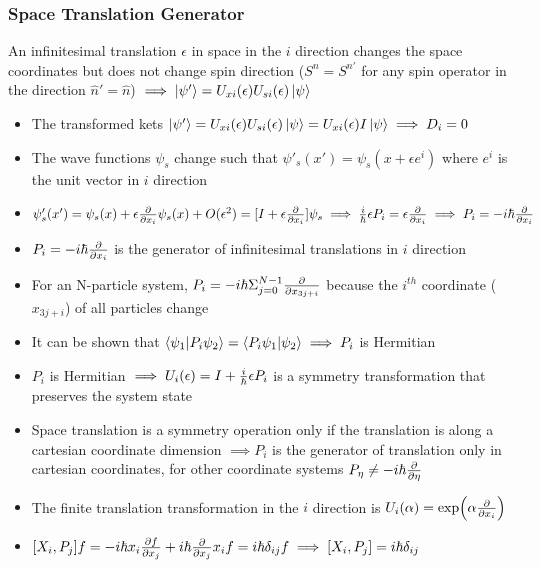 \documentclass[8pt,t,mathserif,aspectratio=169]{beamer}
\begin{document}
\begin{frame}
  \frametitle{Space Translation Generator}
  \vspace{1mm}
  An infinitesimal translation $\epsilon$ in space in the $i$ direction changes the space coordinates but does not change spin direction ($S^n = S^{n'}$ for any spin operator in the direction $\hat{n}' = \hat{n}$) $\implies \ket{\psi'} = U_{xi}(\epsilon) U_{si}(\epsilon) \ket{\psi}$
  \begin{itemize}
    \item The transformed kets $\ket{\psi'} = U_{xi}(\epsilon) U_{si}(\epsilon) \ket{\psi} = U_{xi}(\epsilon) I \ket{\psi} \implies D_i = 0$
    \item The wave functions $\psi_s$ change such that $\psi'_s(x') = \psi_s(x + \epsilon e^i)$ where $e^i$ is the unit vector in $i$ direction
    \item $\psi'_s(x') = \psi_s(x) + \epsilon {\partial \over \partial x_i} \psi_s(x) + O(\epsilon^2) = [I + \epsilon {\partial \over \partial x_i}] \psi_s \implies {i \over \hbar} \epsilon P_i = \epsilon {\partial \over \partial x_i} \implies P_i = -i \hbar {\partial \over \partial x_i}$
    \item $P_i = -i \hbar {\partial \over \partial x_i}$ is the generator of infinitesimal translations in $i$ direction
    \item For an N-particle system, $P_i = -i \hbar \Sigma^{N -1}_{j = 0} {\partial \over \partial x_{3j + i}}$ because the $i^{th}$ coordinate ($x_{3j + i}$) of all particles change
    \item It can be shown that $\bra{\psi_1}\ket{P_i \psi_2} = \bra{P_i \psi_1} \ket{\psi_2} \implies P_i$ is Hermitian 
    \item $P_i$ is Hermitian $\implies U_i(\epsilon) = I + {i \over \hbar} \epsilon P_i$ is a symmetry transformation that preserves the system state
    \item Space translation is a symmetry operation only if the translation is along a cartesian coordinate dimension $\implies P_i$ is the generator of translation only in cartesian coordinates, for other coordinate systems $P_\eta \neq -i \hbar {\partial \over \partial \eta}$
    \item The finite translation transformation in the $i$ direction is $U_i(\alpha) = \exp(\alpha {\partial \over \partial x_i})$
    \item $[X_i,P_j]f = -i \hbar x_i {\partial f \over \partial x_j} + i \hbar {\partial \over \partial x_j} x_i f = i \hbar \delta_{ij} f \implies [X_i,P_j] = i \hbar \delta_{ij}$
  \end{itemize}
\end{frame}
\end{document}
